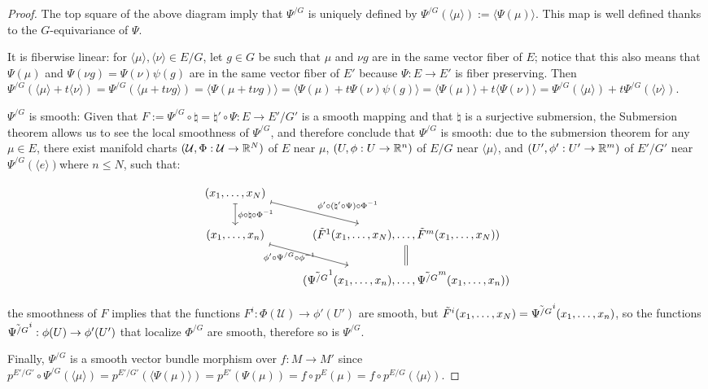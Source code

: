 \begin{proof}
The top square of the above diagram imply that $\Psi^{/G}$ is uniquely defined by $\Psi^{/G}(\langle \mu \rangle) := \langle \Psi(\mu) \rangle$. This map is well defined thanks to the $G$-equivariance of $\Psi$.

It is fiberwise linear: for $\langle \mu \rangle, \langle \nu \rangle \in E/G$, let $g \in G$ be such that $\mu$ and $\nu g$ are in the same vector fiber of $E$; notice that this also means that $\Psi(\mu)$ and $\Psi(\nu g) = \Psi(\nu) \psi(g)$ are in the same vector fiber of $E'$ because $\Psi:E \to E'$ is fiber preserving. 
Then $\Psi^{/G}(\langle \mu \rangle + t\langle \nu \rangle) = \Psi^{/G}(\langle \mu  + t \nu g \rangle)  = \langle \Psi(\mu + t \nu g ) \rangle = \langle \Psi(\mu) + t \Psi(\nu)\psi(g) \rangle = \langle \Psi(\mu) \rangle + t \langle \Psi(\nu) \rangle = \Psi^{/G}(\langle \mu \rangle) + t\Psi^{/G}(\langle \nu \rangle)$.

$\Psi^{/G}$ is smooth: Given that $F := \Psi^{/G} \circ \natural = \natural' \circ \Psi : E \to E'/G'$ is a smooth mapping and that $\natural$ is a surjective submersion, the Submersion theorem allows us to see the local smoothness of $\Psi^{/G}$, and therefore conclude that $\Psi^{/G}$ is smooth: due to the submersion theorem for any $\mu \in E$, there exist manifold charts $(\mathcal U, \Phi: \mathcal U \to \mathbb{R}^N)$ of $E$ near $\mu$, $(U, \phi: U \to \RR^n)$ of $E/G$ near $\langle \mu \rangle$, and $(U', \phi': U' \to \RR^m)$ of $E'/G'$ near $\Psi^{/G}(\langle e \rangle)$where $n \leq N$, such that: %

\[
\begin{tikzcd}
    (x_1, \dots, x_N) \arrow[mapsto]{rd}{\phi' \circ (\natural' \circ \Psi) \circ \Phi^{-1} } \arrow[mapsto]{d}{\phi \circ \natural \circ \Phi^{-1}} & \\
    (x_1, \dots, x_n) \arrow[mapsto]{rd}[below, near start]{\phi' \circ \Psi^{/G} \circ \phi^{-1}} & (\Tilde F^1(x_1, \dots, x_N), \dots, \Tilde F^m(x_1, \dots, x_N)) \arrow[equal]{d}\\
    & (\Tilde{\Psi^{/G}}^1(x_1, \dots, x_n), \dots, \Tilde{\Psi^{/G}}^m(x_1, \dots, x_n))
\end{tikzcd}
\]

the smoothness of $F$ implies that the functions $F^i:\Phi(\mathcal U) \to \phi'(U')$ are smooth, but $\Tilde F^i(x_1, \dots, x_N) = \Tilde{\Psi^{/G}}^i(x_1, \dots, x_n)$, so the functions $\Tilde{\Psi^{/G}}^i:\phi(U) \to \phi'(U')$ that localize $\Phi^{/G}$ are smooth, therefore so is $\Psi^{/G}$. 

Finally, $\Psi^{/G}$ is a smooth vector bundle morphism over $f:M \to M'$ since $p^{E'/G'} \circ \Psi^{/G}(\langle \mu \rangle) = p^{E'/G'}(\langle \Psi(\mu) \rangle) = p^{E'}(\Psi(\mu)) = f \circ p^E (\mu) = f \circ p^{E/G} (\langle \mu \rangle)$.

\end{proof}

